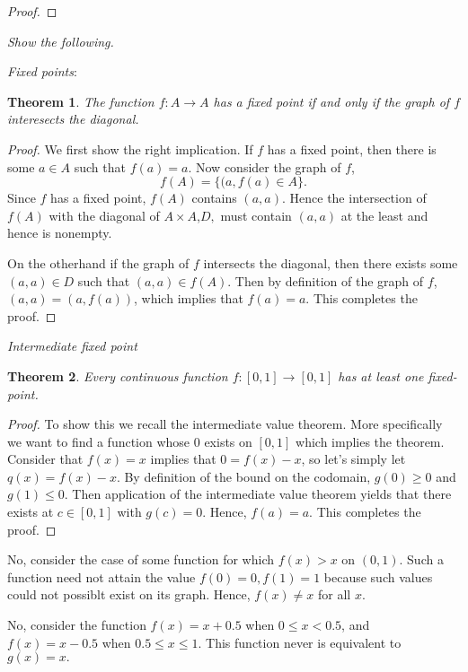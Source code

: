 \documentclass[letter]{article}
\newtheorem{theorem}{Theorem}
\newenvironment{menumerate}{%
  \edef\backupindent{\the\parindent}%
  \enumerate%
  \setlength{\parindent}{\backupindent}%
}{\endenumerate}
\begin{document}
\begin{menumerate}
\begin{proof}
		\end{proof}

	\setcounter{enumi}{21}
	\item \textit{Show the following.} 
		\begin{menumerate}
			\item \textit{Fixed points}: \begin{theorem}
				The function $f: A \to A$ has a fixed point if and only if the graph of $f$ interesects the diagonal.
			\end{theorem}
			\begin{proof}
				We first show the right implication. If $f$ has a fixed point, then there is some $a \in A$ such that $f(a) = a$. Now consider the graph of $f$, 
				$$f(A) = \{(a, f(a) \in A\}.$$ 
				Since $f$ has a fixed point, $f(A)$ contains $(a,a).$ Hence the intersection of $f(A)$ with the diagonal of $A\times A$,$D,$ must contain $(a,a)$ at the least and hence is nonempty.

				On the otherhand if the graph of $f$ intersects the diagonal, then there exists some $(a,a) \in D$ such that $(a,a) \in f(A).$ Then by definition of the graph of $f$, $(a,a) = (a,f(a))$, which implies that $f(a) = a.$ This completes the proof.
			\end{proof}


			\item \textit{Intermediate fixed point}
			\begin{theorem}
				Every continuous function $f: [0,1] \to [0,1]$ has at least one fixed-point.
			\end{theorem}
			\begin{proof}
				To show this we recall the intermediate value theorem. More specifically we want to find a function whose $0$ exists on $[0,1]$ which implies the theorem. Consider that $f(x) =x$ implies that $0 = f(x) - x$, so let's simply let $q(x) = f(x) - x$. By definition of the bound on the codomain, $g(0) \geq 0$ and $g(1) \leq 0$. Then application of the intermediate value theorem yields that there exists at $c \in [0,1]$ with $g(c) = 0.$ Hence, $f(a) = a$. This completes the proof.
			\end{proof}
			\item No, consider the case of some function for which $f(x) > x$ on $(0,1)$. Such a function need not attain the value $f(0) = 0, f(1) = 1$ because such values could not possiblt exist on its graph. Hence, $f(x) \neq x$ for all $x$. 
			\item No, consider the function $f(x) = x+0.5$ when $0\leq x < 0.5$, and $f(x) = x-0.5$ when $0.5 \leq x \leq 1$. This function never is equivalent to $g(x) = x.$
		\end{menumerate}


\end{menumerate}
\end{document}

